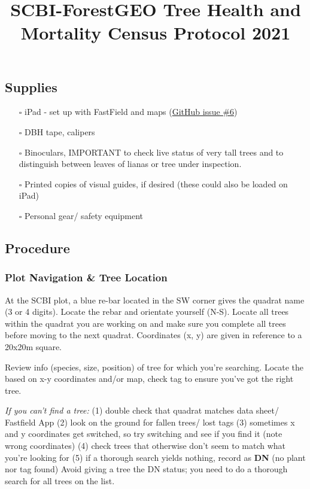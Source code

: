 \documentclass[
]{article}
\title{SCBI-ForestGEO Tree Health and Mortality Census Protocol 2021}
\author{}
\date{\vspace{-2.5em}}
\providecommand{\tightlist}{%
  \setlength{\itemsep}{0pt}\setlength{\parskip}{0pt}}
\begin{document}
\maketitle

\hypertarget{supplies}{%
\subsection{Supplies}\label{supplies}}

\begin{itemize}
\tightlist
\item[$\square$]
  iPad - set up with FastField and maps
  (\href{https://github.com/SCBI-ForestGEO/SCBImortality/issues/6}{GitHub
  issue \#6})
\item[$\square$]
  DBH tape, calipers
\item[$\square$]
  Binoculars, IMPORTANT to check live status of very tall trees and to
  distinguish between leaves of lianas or tree under inspection.
\item[$\square$]
  Printed copies of visual guides, if desired (these could also be
  loaded on iPad)
\item[$\square$]
  Personal gear/ safety equipment
\end{itemize}

\hypertarget{procedure}{%
\subsection{Procedure}\label{procedure}}

\hypertarget{plot-navigation-tree-location}{%
\subsubsection{Plot Navigation \& Tree
Location}\label{plot-navigation-tree-location}}

At the SCBI plot, a blue re-bar located in the SW corner gives the
quadrat name (3 or 4 digits). Locate the rebar and orientate yourself
(N-S). Locate all trees within the quadrat you are working on and make
sure you complete all trees before moving to the next quadrat.
Coordinates (x, y) are given in reference to a 20x20m square.

Review info (species, size, position) of tree for which you're
searching. Locate the based on x-y coordinates and/or map, check tag to
ensure you've got the right tree.

\emph{If you can't find a tree:} (1) double check that quadrat matches
data sheet/ Fastfield App (2) look on the ground for fallen trees/ lost
tags (3) sometimes x and y coordinates get switched, so try switching
and see if you find it (note wrong coordinates) (4) check trees that
otherwise don't seem to match what you're looking for (5) if a thorough
search yields nothing, record as \textbf{DN} (no plant nor tag found)
Avoid giving a tree the DN status; you need to do a thorough search for
all trees on the list.
\end{document}
